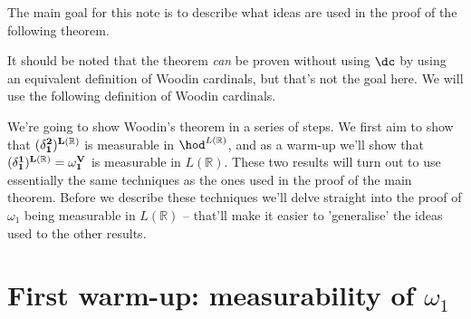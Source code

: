 \newcommand{\mytitle}{From Determinacy to Woodins}
%
%




The main goal for this note is to describe what ideas are used in the proof of the following theorem.


It should be noted that the theorem \textit{can} be proven without using $\dc$ by using an equivalent definition of Woodin cardinals, but that's not the goal here. We will use the following definition of Woodin cardinals.


We're going to show Woodin's theorem in a series of steps. We first aim to show that $(\bf\delta^2_1)^{L(\mathbb R)}$ is measurable in $\hod^{L(\mathbb R)}$, and as a warm-up we'll show that $(\bf\delta^1_1)^{L(\mathbb R)}=\omega_1^V$ is measurable in $L(\mathbb R)$. These two results will turn out to use essentially the same techniques as the ones used in the proof of the main theorem. Before we describe these techniques we'll delve straight into the proof of $\omega_1$ being measurable in $L(\mathbb R)$ -- that'll make it easier to 'generalise' the ideas used to the other results.


\section{First warm-up: measurability of $\omega_1$}

